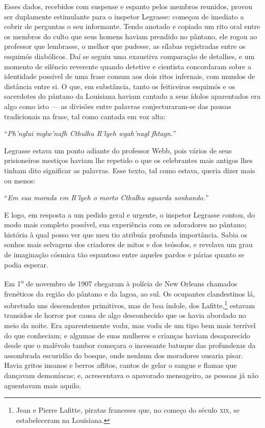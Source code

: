 Esses dados, recebidos com suspense e espanto pelos membros reunidos,
provou ser duplamente estimulante para o inspetor Legrasse: começou de
imediato a cobrir de perguntas o seu informante. Tendo anotado e copiado
um rito oral entre os membros do culto que seus homens haviam prendido
no pântano, ele rogou ao professor que lembrasse, o melhor que pudesse,
as sílabas registradas entre os esquimós diabólicos. Daí se seguiu uma
exaustiva comparação de detalhes, e um momento de silêncio reverente
quando detetive e cientista concordaram sobre a identidade possível de
uma frase comum aos dois ritos infernais, com mundos de distância entre
si. O que, em substância, tanto os feiticeiros esquimós e os sacerdotes
do pântano da Louisiana haviam cantado a seus ídolos aparentados era
algo como isto --- as divisões entre palavras conjecturaram-se das
pausas tradicionais na frase, tal como cantada em voz alta:

``\emph{Ph'nglui mglw'nafh Cthulhu R'lyeh wgah'nagl fhtagn.}''

Legrasse estava um ponto adiante do professor Webb, pois vários de
seus prisioneiros mestiços haviam lhe repetido o que os celebrantes mais antigos
lhes tinham dito significar as palavras. Esse texto, tal
como estava, queria dizer mais ou menos:

``\emph{Em sua morada em R'lyeh o morto Cthulhu aguarda sonhando.}''

E logo, em resposta a um pedido geral e urgente, o inspetor Legrasse
contou, do modo mais completo possível, sua experiência com os
adoradores no pântano; história à qual posso ver que meu tio atribuía
profunda importância. Sabia os sonhos mais selvagens dos criadores de
mitos e dos teósofos, e revelava um grau de imaginação cósmica tão
espantoso entre aqueles pardos e párias quanto se podia esperar.

Em 1\textsuperscript{o} de novembro de 1907 chegaram à polícia de
New Orleans chamados frenéticos da região do pântano e da lagoa, ao sul.
Os ocupantes clandestinos lá, sobretudo uns descendentes primitivos, mas
de boa índole, dos Lafitte,\footnote{Jean e Pierre Lafitte, piratas
  franceses que, no começo do século \textsc{xix}, se estabeleceram na Louisiana.}
estavam transidos de horror por causa de algo desconhecido que os havia
abordado no meio da noite. Era aparentemente vodu, mas vodu de um tipo
bem mais terrível do que conheciam; e algumas de suas mulheres e
crianças haviam desaparecido desde que o malévolo tambor começara o
incessante batuque das profundezas da assombrada escuridão do bosque,
onde nenhum dos moradores ousaria pisar. Havia gritos insanos e berros
aflitos, cantos de gelar o sangue e flamas que dançavam demoníacas; e,
acrescentava o apavorado mensageiro, as pessoas já não aguentavam mais
aquilo.

